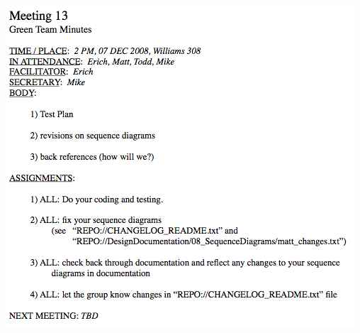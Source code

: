 \begin{flushleft}
	\includegraphics[scale=0.75]{../DesignDocumentation/Minutes/Minutes_13.jpg}
\end{flushleft}